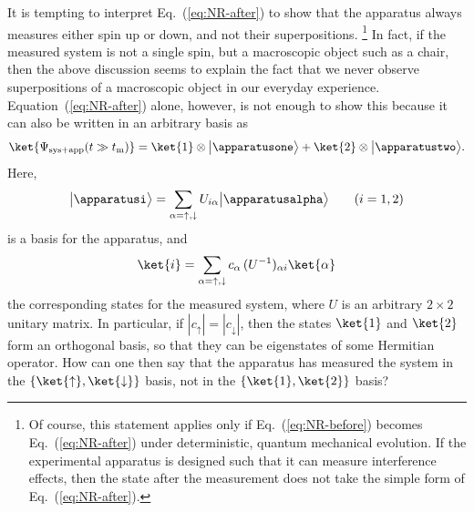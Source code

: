 \documentclass[12pt]{article}
\begin{document}
It is tempting to interpret Eq.~(\ref{eq:NR-after}) to show that 
the apparatus always measures either spin up or down, and not 
their superpositions.%
\footnote{Of course, this statement applies only if Eq.~(\ref{eq:NR-before}) 
 becomes Eq.~(\ref{eq:NR-after}) under deterministic, quantum mechanical 
 evolution.  If the experimental apparatus is designed such that it can 
 measure interference effects, then the state after the measurement does 
 not take the simple form of Eq.~(\ref{eq:NR-after}).}
In fact, if the measured system is not a single spin, but a macroscopic 
object such as a chair, then the above discussion seems to explain the 
fact that we never observe superpositions of a macroscopic object in our 
everyday experience.  Equation~(\ref{eq:NR-after}) alone, however, is 
not enough to show this because it can also be written in an arbitrary 
basis as~\cite{Zurek:1981xq}
%
\begin{equation}
  \ket{\Psi_{{\rm sys}+{\rm app}}(t \gg t_{\rm m})} = 
    \ket{1} \otimes \bigl|\apparatusone\bigr> 
    + \ket{2} \otimes \bigl|\apparatustwo\bigr>.
\label{eq:NR-basis}
\end{equation}
%
Here,
%
\begin{equation}
  \bigl|\apparatusi\bigr> = \sum_{\alpha=\uparrow,\downarrow} 
    U_{i\alpha} \bigl|\apparatusalpha\bigr>
\qquad
  (i = 1,2)
\label{eq:app-basis}
\end{equation}
%
is a basis for the apparatus, and
%
\begin{equation}
  \ket{i} = \sum_{\alpha=\uparrow,\downarrow} 
    c_\alpha\, (U^{-1})_{\alpha i} \ket{\alpha}
\label{eq:sys-basis}
\end{equation}
%
the corresponding states for the measured system, where $U$ is an 
arbitrary $2 \times 2$ unitary matrix.  In particular, if $|c_\uparrow| 
= |c_\downarrow|$, then the states $\ket{1}$ and $\ket{2}$ form an 
orthogonal basis, so that they can be eigenstates of some Hermitian 
operator.  How can one then say that the apparatus has measured the 
system in the $\{ \ket{\uparrow}, \ket{\downarrow} \}$ basis, not 
in the $\{ \ket{1}, \ket{2} \}$ basis?
\end{document}
